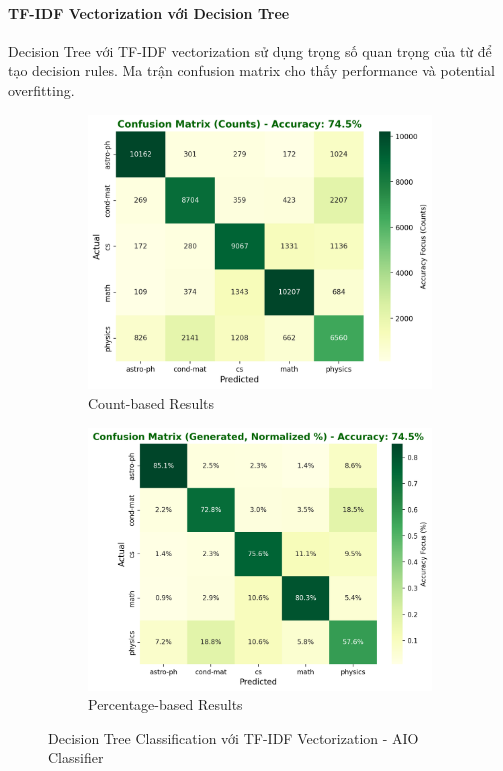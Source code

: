 \paragraph{TF-IDF Vectorization với Decision Tree}

Decision Tree với TF-IDF vectorization sử dụng trọng số quan trọng của từ để tạo decision rules. Ma trận confusion matrix cho thấy performance và potential overfitting.

\begin{figure}[H]
\centering
\begin{subfigure}{0.48\textwidth}
    \centering
    \includegraphics[width=\textwidth]{image/DT_tfidf_count.png}
    \caption{Count-based Results}
    \label{fig:dt_tfidf_count_improvements}
\end{subfigure}
\hfill
\begin{subfigure}{0.48\textwidth}
    \centering
    \includegraphics[width=\textwidth]{image/DT_tfidf_percent.png}
    \caption{Percentage-based Results}
    \label{fig:dt_tfidf_percent_improvements}
\end{subfigure}
\caption{Decision Tree Classification với TF-IDF Vectorization - AIO Classifier}
\label{fig:dt_tfidf_results_improvements}
\end{figure}


